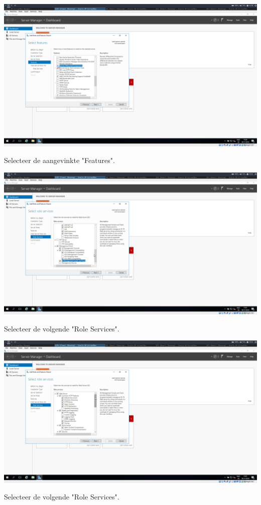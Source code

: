 \documentclass[a4paper]{article}
\begin{document}
\begin{center}
	\includegraphics[width=15cm]{Pictures/SCCM/3/1543499901.png}
	
		Selecteer de aangevinkte "Features".
\end{center}
\begin{center}
	\includegraphics[width=15cm]{Pictures/SCCM/3/1543500064.png}
	
	Selecteer de volgende "Role Services".
\end{center}
\begin{center}
	\includegraphics[width=15cm]{Pictures/SCCM/3/1543500068.png}
	
		Selecteer de volgende "Role Services".
\end{center}
\end{document}
